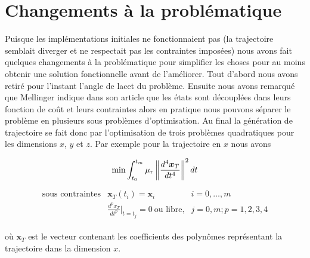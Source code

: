 \section{Changements à la problématique}

Puisque les implémentations initiales ne fonctionnaient pas (la trajectoire semblait diverger et ne respectait pas les contraintes imposées) nous avons fait quelques changements à la problématique pour simplifier les choses pour au moins obtenir une solution fonctionnelle avant de l'améliorer. Tout d'abord nous avons retiré pour l'instant l'angle de lacet du problème. Ensuite nous avons remarqué que Mellinger indique dans son article que les états sont découplées dans leurs fonction de coût et leurs contraintes alors en pratique nous pouvons séparer le problème en plusieurs sous problèmes d'optimisation. Au final la génération de trajectoire se fait donc par l'optimisation de trois problèmes quadratiques pour les dimensions $x$, $y$ et $z$. Par exemple pour la trajectoire en $x$ nous avons

\begin{align}\label{eq:opt_x}
\text{min} \int_{t_0}^{t_m} \mu_r \left\lVert\frac{d^4 \boldsymbol{x}_T}{dt^4}\right\rVert^2 dt
\end{align}\begin{align*}
	\begin{array}{lll}
		\text{sous contraintes} & \boldsymbol{x}_T(t_i) = \boldsymbol{x}_i & i = 0, \ldots, m\\
		& \frac{d^p x_T}{dt^p}|_{t=t_j} = 0\ \text{ou libre,} & j = 0, m; p = 1, 2, 3, 4
	\end{array}
\end{align*}

où $\boldsymbol{x}_T$ est le vecteur contenant les coefficients des polynômes représentant la trajectoire dans la dimension $x$.

